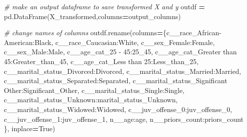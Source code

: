 \documentclass[12pt, twoside]{amherstthesis}
\newenvironment{Shaded}{\begin{snugshade}}{\end{snugshade}}
\newcommand{\CommentTok}[1]{\textcolor[rgb]{0.56,0.35,0.01}{\textit{#1}}}
\newcommand{\NormalTok}[1]{#1}
\newcommand{\OperatorTok}[1]{\textcolor[rgb]{0.81,0.36,0.00}{\textbf{#1}}}
\newcommand{\StringTok}[1]{\textcolor[rgb]{0.31,0.60,0.02}{#1}}
\newcommand{\VariableTok}[1]{\textcolor[rgb]{0.00,0.00,0.00}{#1}}
\begin{document}
\begin{Shaded}
\begin{Highlighting}[]
\CommentTok{\# make an output dataframe to save transformed X and y}
\NormalTok{outdf }\OperatorTok{=}\NormalTok{ pd.DataFrame(X\_transformed,columns}\OperatorTok{=}\NormalTok{output\_columns)}

\CommentTok{\# change names of columns }
\NormalTok{outdf.rename(columns}\OperatorTok{=}\NormalTok{\{}\StringTok{\textquotesingle{}c\_\_race\_African{-}American\textquotesingle{}}\NormalTok{:}\StringTok{\textquotesingle{}Black\textquotesingle{}}\NormalTok{, }
\StringTok{\textquotesingle{}c\_\_race\_Caucasian\textquotesingle{}}\NormalTok{:}\StringTok{\textquotesingle{}White\textquotesingle{}}\NormalTok{, }\StringTok{\textquotesingle{}c\_\_sex\_Female\textquotesingle{}}\NormalTok{:}\StringTok{\textquotesingle{}Female\textquotesingle{}}\NormalTok{, }
\StringTok{\textquotesingle{}c\_\_sex\_Male\textquotesingle{}}\NormalTok{:}\StringTok{\textquotesingle{}Male\textquotesingle{}}\NormalTok{, }\StringTok{\textquotesingle{}c\_\_age\_cat\_25 {-} 45\textquotesingle{}}\NormalTok{:}\StringTok{\textquotesingle{}25\_45\textquotesingle{}}\NormalTok{, }
\StringTok{\textquotesingle{}c\_\_age\_cat\_Greater than 45\textquotesingle{}}\NormalTok{:}\StringTok{\textquotesingle{}Greater\_than\_45\textquotesingle{}}\NormalTok{, }
\StringTok{\textquotesingle{}c\_\_age\_cat\_Less than 25\textquotesingle{}}\NormalTok{:}\StringTok{\textquotesingle{}Less\_than\_25\textquotesingle{}}\NormalTok{, }
\StringTok{\textquotesingle{}c\_\_marital\_status\_Divorced\textquotesingle{}}\NormalTok{:}\StringTok{\textquotesingle{}Divorced\textquotesingle{}}\NormalTok{,}
\StringTok{\textquotesingle{}c\_\_marital\_status\_Married\textquotesingle{}}\NormalTok{:}\StringTok{\textquotesingle{}Married\textquotesingle{}}\NormalTok{, }
\StringTok{\textquotesingle{}c\_\_marital\_status\_Separated\textquotesingle{}}\NormalTok{:}\StringTok{\textquotesingle{}Separated\textquotesingle{}}\NormalTok{, }
\StringTok{\textquotesingle{}c\_\_marital\_status\_Significant Other\textquotesingle{}}\NormalTok{:}\StringTok{\textquotesingle{}Significant\_Other\textquotesingle{}}\NormalTok{, }
\StringTok{\textquotesingle{}c\_\_marital\_status\_Single\textquotesingle{}}\NormalTok{:}\StringTok{\textquotesingle{}Single\textquotesingle{}}\NormalTok{, }
\StringTok{\textquotesingle{}c\_\_marital\_status\_Unknown\textquotesingle{}}\NormalTok{:}\StringTok{\textquotesingle{}marital\_status\_Unknown\textquotesingle{}}\NormalTok{,}
\StringTok{\textquotesingle{}c\_\_marital\_status\_Widowed\textquotesingle{}}\NormalTok{:}\StringTok{\textquotesingle{}Widowed\textquotesingle{}}\NormalTok{, }
\StringTok{\textquotesingle{}c\_\_juv\_offense\_0\textquotesingle{}}\NormalTok{:}\StringTok{\textquotesingle{}juv\_offense\_0\textquotesingle{}}\NormalTok{, }\StringTok{\textquotesingle{}c\_\_juv\_offense\_1\textquotesingle{}}\NormalTok{:}\StringTok{\textquotesingle{}juv\_offense\_1\textquotesingle{}}\NormalTok{, }
\StringTok{\textquotesingle{}n\_\_age\textquotesingle{}}\NormalTok{:}\StringTok{\textquotesingle{}age\textquotesingle{}}\NormalTok{, }\StringTok{\textquotesingle{}n\_\_priors\_count\textquotesingle{}}\NormalTok{:}\StringTok{\textquotesingle{}priors\_count\textquotesingle{}}\NormalTok{ \},}
\NormalTok{inplace}\OperatorTok{=}\VariableTok{True}\NormalTok{)}
    

\end{Highlighting}
\end{Shaded}
\end{document}

